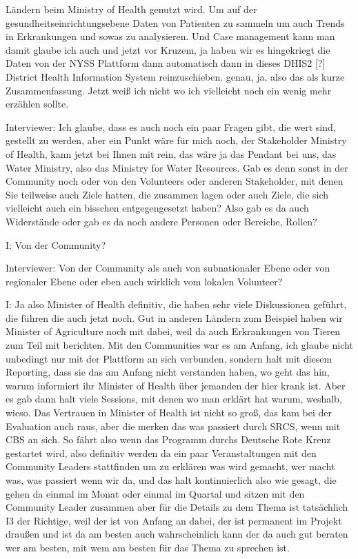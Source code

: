 L{\"a}ndern beim Ministry of Health genutzt wird. Um auf der gesundheitseinrichtungsebene Daten von Patienten zu sammeln um auch Trends in Erkrankungen und sowas  zu analysieren. Und Case management kann man damit glaube ich auch und jetzt vor Kruzem, ja haben wir es hingekriegt die Daten von der NYSS Plattform dann automatisch dann in dieses DHIS2 [?] District Health Information System reinzuschieben. genau, ja, also das als kurze Zusammenfassung. Jetzt weiß ich nicht wo ich vielleicht noch ein wenig mehr erz{\"a}hlen sollte. 

Interviewer: Ich glaube, dass es auch noch ein paar Fragen gibt, die wert sind, gestellt zu werden, aber ein Punkt w{\"a}re f{\"u}r mich noch, der Stakeholder Ministry of Health, kann jetzt bei Ihnen mit rein, das w{\"a}re ja das Pendant bei uns, das Water Ministry, also das Ministry for Water Resources. Gab es denn sonst in der Community noch oder von den Volunteers oder anderen Stakeholder, mit denen Sie teilweise auch Ziele hatten, die zusammen lagen oder auch Ziele, die sich vielleicht auch ein bisschen entgegengesetzt haben? Also gab es da auch Widerst{\"a}nde oder gab es da noch andere Personen oder Bereiche, Rollen?

I: Von der Community?

Interviewer: Von der Community als auch von subnationaler Ebene oder von regionaler Ebene oder eben auch wirklich vom lokalen Volunteer? 

I: Ja also Minister of Health definitiv, die haben sehr viele Diskussionen gef{\"u}hrt, die f{\"u}hren die auch jetzt noch. Gut in anderen L{\"a}ndern zum Beispiel haben wir Minister of Agriculture noch mit dabei, weil da auch Erkrankungen von Tieren zum Teil mit berichten. Mit den Communities war es am Anfang, ich glaube nicht unbedingt nur mit der Plattform an sich verbunden, sondern halt mit diesem Reporting, dass sie das am Anfang nicht verstanden haben, wo geht das hin, warum informiert ihr Minister of Health {\"u}ber jemanden der hier krank ist. Aber es gab dann halt viele Sessions, mit denen wo man erkl{\"a}rt hat warum, weshalb, wieso. Das Vertrauen in Minister of Health ist nicht so groß, das kam bei der Evaluation auch raus, aber die merken das was passiert durch SRCS, wenn mit CBS an sich. So f{\"a}hrt also wenn das Programm durchs Deutsche Rote Kreuz gestartet wird, also definitiv werden da ein paar Veranstaltungen mit den Community Leaders stattfinden um zu erkl{\"a}ren was wird gemacht, wer macht was, was passiert wenn wir da, und das halt kontinuierlich also wie gesagt, die gehen da einmal im Monat oder einmal im Quartal und sitzen mit den Community Leader zusammen aber f{\"u}r die Details zu dem Thema ist tats{\"a}chlich I3 der Richtige, weil der ist von Anfang an dabei, der ist permanent im Projekt draußen und ist da am besten auch wahrscheinlich kann der da auch gut beraten wer am besten, mit wem am besten f{\"u}r das Thema zu sprechen ist. 

